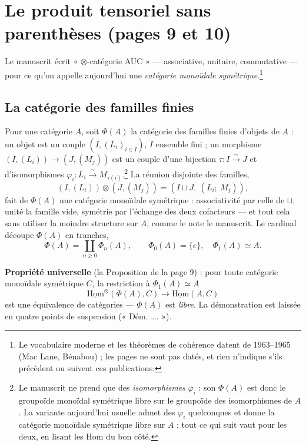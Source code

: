 \documentclass[11pt,a4paper]{article}
\begin{document}
\section*{Le produit tensoriel sans parenthèses (pages 9 et 10)}

Le manuscrit écrit « $\otimes$-catégorie AUC » — associative, unitaire,
commutative — pour ce qu'on appelle aujourd'hui une \emph{catégorie
monoïdale symétrique}.\footnote{Le vocabulaire moderne et les théorèmes de
cohérence datent de 1963--1965 (Mac Lane, Bénabou) ; les pages ne sont
pas datés, et rien n'indique s'ils précèdent ou suivent ces publications.}

\subsection*{La catégorie des familles finies}

Pour une catégorie $A$, soit $\Phi(A)$ la catégorie des familles finies
d'objets de $A$ : un objet est un couple $(I, (L_i)_{i \in I})$, $I$
ensemble fini ; un morphisme
$(I, (L_i)) \to (J, (M_j))$ est un couple d'une bijection
$\tau : I \xrightarrow{\sim} J$ et d'isomorphismes
$\varphi_i : L_i \xrightarrow{\sim} M_{\tau(i)}$.\footnote{Le manuscrit ne
prend que des \emph{isomorphismes} $\varphi_i$ : son $\Phi(A)$ est donc le
groupoïde monoïdal symétrique libre sur le groupoïde des isomorphismes de
$A$. La variante aujourd'hui usuelle admet des $\varphi_i$ quelconques et
donne la catégorie monoïdale symétrique libre sur $A$ ; tout ce qui suit
vaut pour les deux, en lisant les Hom du bon côté.} La réunion disjointe
des familles,
\[
(I, (L_i)) \otimes (J, (M_j)) = (I \sqcup J,\ (L_i;\ M_j)),
\]
fait de $\Phi(A)$ une catégorie monoïdale symétrique : associativité par
celle de $\sqcup$, unité la famille vide, symétrie par l'échange des deux
cofacteurs — et tout cela sans utiliser la moindre structure sur $A$, comme
le note le manuscrit. Le cardinal découpe $\Phi(A)$ en tranches,
\[
\Phi(A) = \coprod_{n \geq 0} \Phi_n(A), \qquad
\Phi_0(A) = \{e\}, \quad \Phi_1(A) \simeq A.
\]

\textbf{Propriété universelle} (la Proposition de la page 9) : pour toute
catégorie monoïdale symétrique $C$, la restriction à $\Phi_1(A) \simeq A$
\[
\underline{\mathrm{Hom}}^{\otimes}(\Phi(A), C) \longrightarrow
\underline{\mathrm{Hom}}(A, C)
\]
est une équivalence de catégories — $\Phi(A)$ est \emph{libre}. La
démonstration est laissée en quatre points de suspension (« Dém. …. »).
\end{document}
